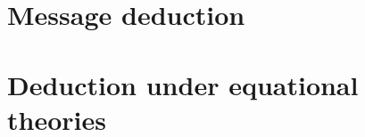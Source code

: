 \documentclass{article}
\begin{document}
    \section{Message deduction}
    

    \newpage

    \section{Deduction under equational theories}
    
\end{document}

